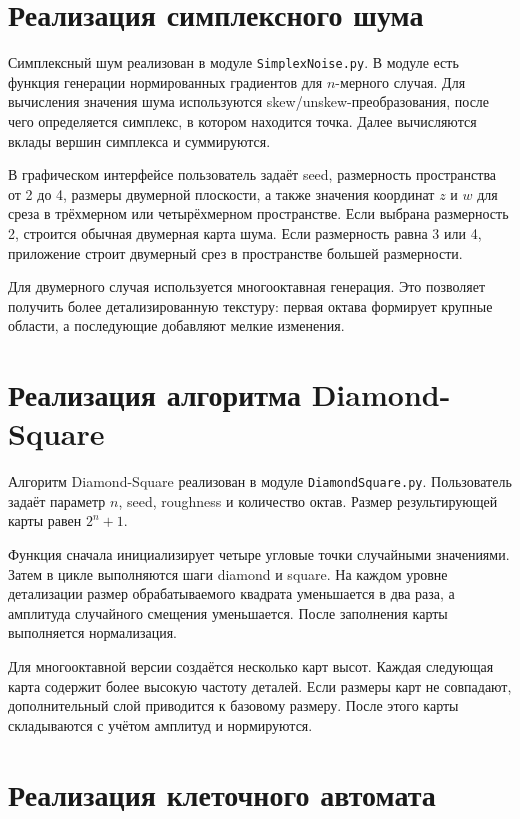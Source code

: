 \section{Реализация симплексного шума}

Симплексный шум реализован в модуле \texttt{SimplexNoise.py}. В модуле есть функция генерации нормированных градиентов для $n$-мерного случая. Для вычисления значения шума используются skew/unskew-преобразования, после чего определяется симплекс, в котором находится точка. Далее вычисляются вклады вершин симплекса и суммируются.

В графическом интерфейсе пользователь задаёт seed, размерность пространства от 2 до 4, размеры двумерной плоскости, а также значения координат $z$ и $w$ для среза в трёхмерном или четырёхмерном пространстве. Если выбрана размерность 2, строится обычная двумерная карта шума. Если размерность равна 3 или 4, приложение строит двумерный срез в пространстве большей размерности.

Для двумерного случая используется многооктавная генерация. Это позволяет получить более детализированную текстуру: первая октава формирует крупные области, а последующие добавляют мелкие изменения.

\section{Реализация алгоритма Diamond-Square}

Алгоритм Diamond-Square реализован в модуле \texttt{DiamondSquare.py}. Пользователь задаёт параметр $n$, seed, roughness и количество октав. Размер результирующей карты равен $2^n+1$.

Функция сначала инициализирует четыре угловые точки случайными значениями. Затем в цикле выполняются шаги diamond и square. На каждом уровне детализации размер обрабатываемого квадрата уменьшается в два раза, а амплитуда случайного смещения уменьшается. После заполнения карты выполняется нормализация.

Для многооктавной версии создаётся несколько карт высот. Каждая следующая карта содержит более высокую частоту деталей. Если размеры карт не совпадают, дополнительный слой приводится к базовому размеру. После этого карты складываются с учётом амплитуд и нормируются.

\section{Реализация клеточного автомата}

